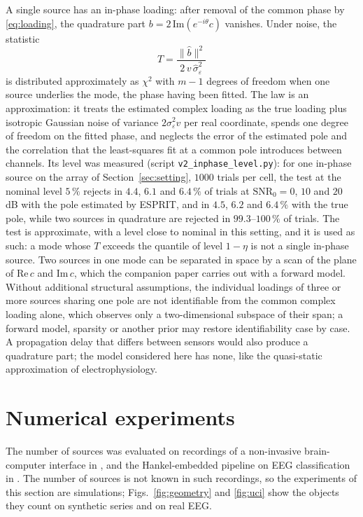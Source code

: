 \documentclass{article}
\begin{document}
A single source has an in-phase loading: after removal of the common phase by \eqref{eq:loading}, the quadrature part $b = 2\, \mathrm{Im}(e^{-i\theta} c)$ vanishes. Under noise, the statistic \[
T = \frac{\lVert \widehat{b} \rVert^{2}}{2\, v\, \widehat{\sigma}_\varepsilon^{2}}
\] is distributed approximately as $\chi^2$ with $m - 1$ degrees of freedom when one source underlies the mode, the phase having been fitted. The law is an approximation: it treats the estimated complex loading as the true loading plus isotropic Gaussian noise of variance $2\sigma_\varepsilon^{2} v$ per real coordinate, spends one degree of freedom on the fitted phase, and neglects the error of the estimated pole and the correlation that the least-squares fit at a common pole introduces between channels. Its level was measured (script \texttt{v2\_inphase\_level.py}): for one in-phase source on the array of Section~\ref{sec:setting}, $1000$ trials per cell, the test at the nominal level $5\,\%$ rejects in $4.4$, $6.1$ and $6.4\,\%$ of trials at $\mathrm{SNR}_0 = 0$, $10$ and $20$ dB with the pole estimated by ESPRIT, and in $4.5$, $6.2$ and $6.4\,\%$ with the true pole, while two sources in quadrature are rejected in $99.3$--$100\,\%$ of trials. The test is approximate, with a level close to nominal in this setting, and it is used as such: a mode whose $T$ exceeds the quantile of level $1 - \eta$ is not a single in-phase source. Two sources in one mode can be separated in space by a scan of the plane of $\mathrm{Re}\,c$ and $\mathrm{Im}\,c$, which the companion paper \cite{ref-companion} carries out with a forward model. Without additional structural assumptions, the individual loadings of three or more sources sharing one pole are not identifiable from the common complex loading alone, which observes only a two-dimensional subspace of their span; a forward model, sparsity or another prior may restore identifiability case by case. A propagation delay that differs between sensors would also produce a quadrature part; the model considered here has none, like the quasi-static approximation of electrophysiology.


\section{Numerical experiments}\label{sec:numerical-experiments}

The number of sources was evaluated on recordings of a non-invasive brain-computer interface in \cite{ref-BernadotteBuchstaber, ref-Bernadotte05}, and the Hankel-embedded pipeline on EEG classification in \cite{ref-Bernadotte06}. The number of sources is not known in such recordings, so the experiments of this section are simulations; Figs.~\ref{fig:geometry} and \ref{fig:uci} show the objects they count on synthetic series and on real EEG.
\end{document}
